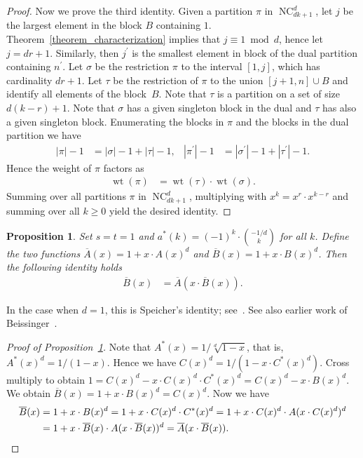 \documentclass[11pt]{amsart}
\newtheorem{proposition}[theorem]{Proposition}
\numberwithin{equation}{section}
\DeclareMathOperator{\wt}{wt}
\DeclareMathOperator{\NC}{NC}
\begin{document}
\begin{proof}
Now we prove the third identity.
Given a partition $\pi$ in $\NC^{d}_{dk+1}$,
let $j$ be the largest element in the block $B$ containing $1$.
Theorem~\ref{theorem_characterization} implies
that $j \equiv 1 \bmod d$, hence let $j = dr+1$.
Similarly, then $j^{\prime}$ is the smallest element in
block of the dual partition containing $n^{\prime}$.
Let $\sigma$ be the restriction $\pi$ to the interval $[1,j]$,
which has cardinality $dr+1$.
Let $\tau$ be the restriction of $\pi$ to the union $[j+1,n] \cup B$
and identify all elements of the block~$B$.
Note that $\tau$ is a partition on a set of size $d(k-r) + 1$.
Note that $\sigma$ has a given singleton block in the dual
and $\tau$ has also a given singleton block.
Enumerating the blocks in $\pi$ and the blocks in the dual partition
we have
\begin{align*}
|\pi| -1 & = |\sigma| -1 + |\tau| - 1 , &
|\pi^{\prime}| -1 & = |\sigma^{\prime}| -1 + |\tau^{\prime}| - 1 .
\end{align*}
Hence the weight of $\pi$ factors as
\begin{align*}
\wt(\pi) 
& =
\wt(\tau) \cdot \wt(\sigma) .
\end{align*}
Summing over all partitions $\pi$ in $\NC^{d}_{dk+1}$, multiplying with
$x^{k} = x^{r} \cdot x^{k-r}$ and summing over all
$k \geq 0$ yield the desired identity.
\end{proof}

\begin{proposition}
Set $s = t = 1$ and $a^{*}(k) = (-1)^{k} \cdot \binom{-1/d}{k}$ for all $k$.
Define the two functions
$\overline{A}(x) = 1 + x \cdot A(x)^{d}$
and
$\overline{B}(x) = 1 + x \cdot B(x)^{d}$.
Then the following identity holds
\begin{align*}
\overline{B}(x) & = \overline{A}(x \cdot \overline{B}(x)) .
\end{align*}
\label{proposition_Speicher_d}
\end{proposition}
In the case when $d=1$, this is Speicher's identity;
see~\cite[Theorem on page~616]{Speicher}.
See also earlier work of Beissinger~\cite[Theorem~6.7]{Beissinger}.
\begin{proof}[Proof of Proposition~\ref{proposition_Speicher_d}]
Note that $A^{*}(x) = 1/\sqrt[d]{1-x}$,
that is,
$A^{*}(x)^{d} = 1/(1-x)$.
Hence we have
$C(x)^{d} = 1/(1 - x \cdot C^{*}(x)^{d})$.
Cross multiply to obtain
$1 = C(x)^{d} - x \cdot C(x)^{d} \cdot C^{*}(x)^{d} = C(x)^{d} - x \cdot B(x)^{d}$.
We obtain
$\overline{B}(x) = 1 + x \cdot B(x)^{d} = C(x)^{d}$.
Now we have
\begin{align*}
\overline{B}(x)
& =
1 + x \cdot B(x)^{d}
=
1 + x \cdot C(x)^{d} \cdot C^{*}(x)^{d}
=
1 + x \cdot C(x)^{d} \cdot A(x \cdot C(x)^{d})^{d} \\
& =
1 + x \cdot \overline{B}(x) \cdot A(x \cdot \overline{B}(x))^{d}
=
\overline{A}(x \cdot \overline{B}(x)) .
\qedhere
\end{align*}
\end{proof}
\end{document}
